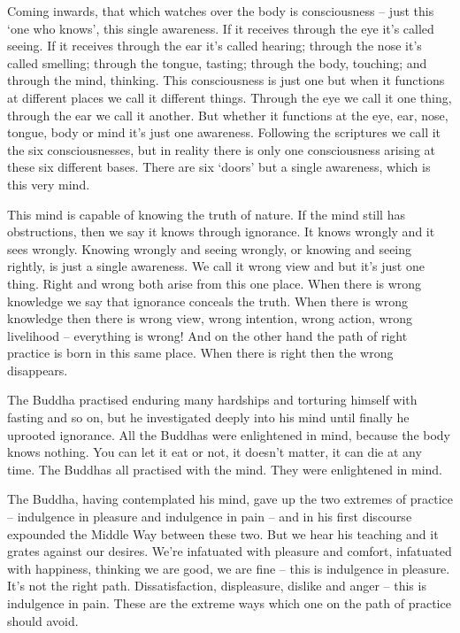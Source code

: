Coming inwards, that which watches over the body is consciousness -- just this `one who knows', this single awareness. If it receives through the eye it's called seeing. If it receives through the ear it's called hearing; through the nose it's called smelling; through the tongue, tasting; through the body, touching; and through the mind, thinking. This consciousness is just one but when it functions at different places we call it different things. Through the eye we call it one thing, through the ear we call it another. But whether it functions at the eye, ear, nose, tongue, body or mind it's just one awareness. Following the scriptures we call it the six consciousnesses, but in reality there is only one consciousness arising at these six different bases. There are six `doors' but a single awareness, which is this very mind. 

This mind is capable of knowing the truth of nature. If the mind still has obstructions, then we say it knows through ignorance. It knows wrongly and it sees wrongly. Knowing wrongly and seeing wrongly, or knowing and seeing rightly, is just a single awareness. We call it wrong view and  but it's just one thing. Right and wrong both arise from this one place. When there is wrong knowledge we say that ignorance conceals the truth. When there is wrong knowledge then there is wrong view, wrong intention, wrong action, wrong livelihood -- everything is wrong! And on the other hand the path of right practice is born in this same place. When there is right then the wrong disappears. 


The Buddha practised enduring many hardships and torturing himself with fasting and so on, but he investigated deeply into his mind until finally he uprooted ignorance. All the Buddhas were enlightened in mind, because the body knows nothing. You can let it eat or not, it doesn't matter, it can die at any time. The Buddhas all practised with the mind. They were enlightened in  mind. 

The Buddha, having contemplated his mind, gave up the two extremes of practice -- indulgence in pleasure and indulgence in pain -- and in his first discourse expounded the Middle Way between these two. But we hear his teaching and it grates against our desires. We're infatuated with pleasure and comfort, infatuated with happiness, thinking we are good, we are fine -- this is indulgence in pleasure. It's not the right path. Dissatisfaction, displeasure, dislike and anger -- this is indulgence in pain. These are the extreme ways which one on the path of practice should avoid. 


